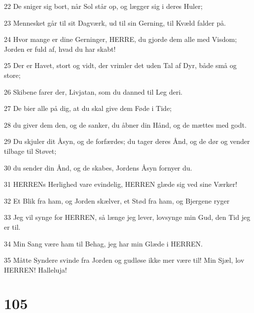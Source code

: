 \par 22 De sniger sig bort, når Sol står op, og lægger sig i deres Huler;
\par 23 Mennesket går til sit Dagværk, ud til sin Gerning, til Kvæld falder på.
\par 24 Hvor mange er dine Gerninger, HERRE, du gjorde dem alle med Visdom; Jorden er fuld af, hvad du har skabt!
\par 25 Der er Havet, stort og vidt, der vrimler det uden Tal af Dyr, både små og store;
\par 26 Skibene farer der, Livjatan, som du danned til Leg deri.
\par 27 De bier alle på dig, at du skal give dem Føde i Tide;
\par 28 du giver dem den, og de sanker, du åbner din Hånd, og de mættes med godt.
\par 29 Du skjuler dit Åsyn, og de forfærdes; du tager deres Ånd, og de dør og vender tilbage til Støvet;
\par 30 du sender din Ånd, og de skabes, Jordens Åsyn fornyer du.
\par 31 HERRENs Herlighed vare evindelig, HERREN glæde sig ved sine Værker!
\par 32 Et Blik fra ham, og Jorden skælver, et Stød fra ham, og Bjergene ryger
\par 33 Jeg vil synge for HERREN, så længe jeg lever, lovsynge min Gud, den Tid jeg er til.
\par 34 Min Sang være ham til Behag, jeg har min Glæde i HERREN.
\par 35 Måtte Syndere svinde fra Jorden og gudløse ikke mer være til! Min Sjæl, lov HERREN! Halleluja!

\chapter{105}

